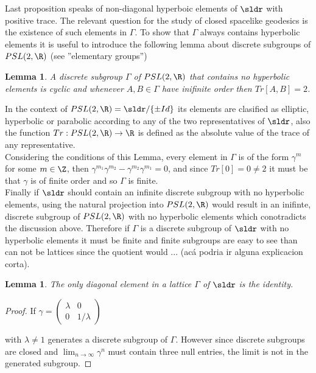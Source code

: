 \documentclass[11pt]{amsart}
\theoremstyle{plain}
\newtheorem{lem}[thm]{Lemma}
\theoremstyle{definition}
\theoremstyle{remark}
\begin{document}
Last proposition speaks of non-diagonal hyperboic elements of $\sldr$ with positive trace. The relevant question for the study of closed spacelike geodesics is the existence of such elements in $\Gamma$. To show that $\Gamma$ always contains hyperbolic elements it is useful to introduce the following lemma about discrete subgroups of $PSL(2, \R)$ (see \cite{CITA} ''elementary groups'')
\begin{lem}
A discrete subgroup $\Gamma$ of $PSL(2,\R)$ that contains no hyperbolic elements is cyclic and whenever $A,B \in \Gamma$ have inifinite order then $Tr[A,B] = 2$.
\end{lem}
In the context of $PSL(2, \R)=\sldr / \{ \pm Id \}$ its elements are clasified as elliptic, hyperbolic or  parabolic according to any of the two representatives of $\sldr$, also the function $Tr: PSL(2, \R) \rightarrow \R$ is defined as the absolute value of the trace of any representative.\\

Considering the conditions of this Lemma, every element in $\Gamma$ is of the form $\gamma^m$ for some $m \in \Z$, then $\gamma^{m_1} \gamma^{m_2 }- \gamma^{m_2} \gamma^{m_1} = 0$, and since $Tr[0] = 0 \neq 2$ it must be that $\gamma$ is of finite order and so $\Gamma$ is finite.\\

Finally if $\sldr$ should contain an infinite discrete subgroup with no hyperbolic elements, using the natural projection into $PSL(2, \R)$ would result in an inifinte, discrete subgroup of $PSL(2, \R)$ with no hyperbolic elements which conotradicts the discussion above. Therefore if $\Gamma$ is a discrete subgroup of $\sldr$ with no hyperbolic elements it must be finite and finite subgroups are easy to see than can not be lattices since the quotient would ... (acá podria ir alguna explicacion corta).\\
 


\begin{lem}
The only diagonal element in a lattice $\Gamma$ of $\sldr$ is the identity.
\end{lem}

\begin{proof}
If $\gamma = \left(\begin{array}{cc}
\lambda & 0 \\
0 & 1/\lambda \end{array}\right)$

with $\lambda \neq 1$ generates a discrete subgroup of $\Gamma$. However since discrete subgroups are closed \cite{INCLUDE1} and $ \lim_{n \to \infty} \gamma^n $ must contain three null entries, the limit is not in the generated subgroup.

\end{proof}
\end{document}
